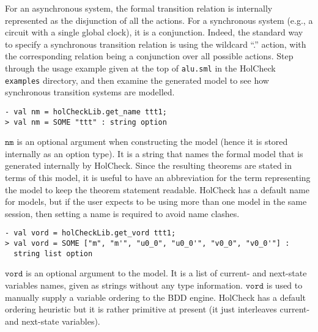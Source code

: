 \documentclass[12pt,fleqn]{article}
\newcommand{\hc}{HolCheck}
\begin{document}
For an asynchronous system, the formal transition relation is internally represented as the disjunction of all the actions. For a synchronous system (e.g., a circuit with a single global clock), it is a conjunction. Indeed, the standard way to specify a synchronous transition relation is using the wildcard ``.'' action, with the corresponding relation being a conjunction over all possible actions. Step through the usage example given at the top of \texttt{alu.sml} in the \hc{} \texttt{examples} directory, and then examine the generated model to see how synchronous transition systems are modelled.

\begin{session}\begin{verbatim}
- val nm = holCheckLib.get_name ttt1;
> val nm = SOME "ttt" : string option
\end{verbatim}\end{session}
\(\mathtt{nm}\) is an optional argument when constructing the model (hence it is stored internally as an option type). It is a string that names the formal model that is generated internally by \hc{}. Since the resulting theorems are stated in terms of this model, it is useful to have an abbreviation for the term representing the model to keep the theorem statement readable. \hc{} has a default name for models, but if the user expects to be using more than one model in the same session, then setting a name is required to avoid name clashes.

\begin{session}\begin{verbatim}
- val vord = holCheckLib.get_vord ttt1;
> val vord = SOME ["m", "m'", "u0_0", "u0_0'", "v0_0", "v0_0'"] :
  string list option
\end{verbatim}\end{session}
\(\mathtt{vord}\) is an optional argument to the model. It is a list of current- and next-state variables names, given as strings without any type information. \(\mathtt{vord}\) is used to manually supply a variable ordering to the BDD engine. \hc{} has a default ordering heuristic but it is rather primitive at present (it just interleaves current- and next-state variables).
\end{document}
